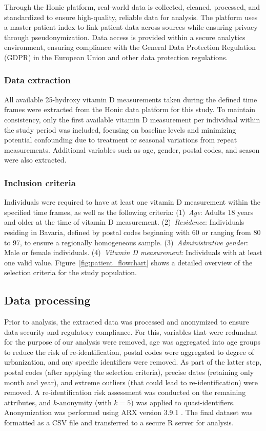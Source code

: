 \documentclass[12pt]{article}
\newcommand{\REV}[1]{\textcolor{black}{#1}}
\begin{document}
Through the Honic platform, real-world data is collected, cleaned, processed, and standardized to ensure high-quality, reliable data for analysis. The platform uses a master patient index to link patient data across sources while ensuring privacy through pseudonymization. Data access is provided within a secure analytics environment, ensuring compliance with the General Data Protection Regulation (GDPR) in the European Union and other data protection regulations.

\subsubsection*{Data extraction}

All available 25-hydroxy vitamin D measurements taken during the defined time frames were extracted from the Honic data platform for this study. To maintain consistency, only the first available vitamin D measurement per individual within the study period was included, focusing on baseline levels and minimizing potential confounding due to treatment or seasonal variations from repeat measurements. Additional variables such as age, gender, postal codes, and season were also extracted.

\subsubsection*{Inclusion criteria}

Individuals were required to have at least one vitamin D measurement within the specified time frames, as well as the following criteria: (1)~\emph{Age}: Adults 18 years and older at the time of vitamin D measurement. (2)~\emph{Residence}: Individuals residing in Bavaria, defined by postal codes beginning with 60 or ranging from 80 to 97, to ensure a regionally homogeneous sample. (3)~\emph{Administrative gender}: Male or female individuals. (4)~\emph{Vitamin D measurement}: Individuals with at least one valid value. Figure~\ref{fig:patient_flowchart} shows a detailed overview of the selection criteria for the study population.

\subsection*{Data processing}

Prior to analysis, the extracted data was processed and anonymized to ensure data security and regulatory compliance. For this, variables that were redundant for the purpose of our analysis were removed, age was aggregated into age groups to reduce the risk of re-identification, \REV{postal codes were aggregated to degree of urbanization}, and any specific identifiers were removed. As part of the latter step, postal codes (after applying the selection criteria), precise dates (retaining only month and year), and extreme outliers (that could lead to re-identification) were removed. A re-identification risk assessment was conducted on the remaining attributes, and $k$-anonymity (with $k=5$) was applied to quasi-identifiers. Anonymization was performed using ARX version 3.9.1 \cite{Prasser2014}. The final dataset was formatted as a CSV file and transferred to a secure R server for analysis.
\end{document}
